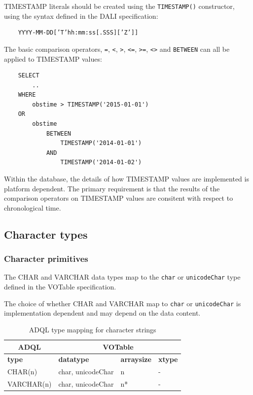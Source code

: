 \documentclass[11pt,a4paper]{ivoa}
\newcommand{\VOTspec}{VOTable specification\xspace}
\newcommand{\DALIspec}{DALI specification\xspace}
\begin{document}
TIMESTAMP literals should be created using the \verb:TIMESTAMP():
constructor, using the syntax defined in the \DALIspec:
\begin{verbatim}
    YYYY-MM-DD[’T’hh:mm:ss[.SSS][’Z’]]
\end{verbatim}

The basic comparison operators, \verb:=:, \verb:<:, \verb:>:, \verb:<=:, \verb:>=:,
\verb:<>: and \verb:BETWEEN: can all be applied to TIMESTAMP values:
\begin{verbatim}
    SELECT
        ..
    WHERE
        obstime > TIMESTAMP('2015-01-01')
    OR
        obstime
            BETWEEN
                TIMESTAMP('2014-01-01')
            AND
                TIMESTAMP('2014-01-02')
\end{verbatim}

Within the database, the details of how TIMESTAMP values are implemented
is platform dependent. The primary requirement is that the results of the
comparison operators on TIMESTAMP values are consitent with respect to
chronological time.

\subsection{Character types}
\label{sec:types.character}

\subsubsection{Character primitives}
\label{sec:types.character.primitive}

The CHAR and VARCHAR data types map to the \verb:char: or
\verb:unicodeChar: type defined in the \VOTspec.

The choice of whether CHAR and VARCHAR map to \verb:char: or
\verb:unicodeChar: is implementation dependent and may depend
on the data content.

\begin{table}[thm]\footnotesize
    \begin{tabular}
        {|p{}|p{}|p{}|p{}|}
        \hline

        \hline
        \multicolumn{1}{|c|}{\textbf{ADQL}} &
        \multicolumn{3}{|c|}{\textbf{VOTable}}
        \tabularnewline
        
        \hline
        \textbf{type} &
        \textbf{datatype} &
        \textbf{arraysize} &
        \textbf{xtype}
        \tabularnewline

        \hline
        CHAR(n) &
        char, unicodeChar &
        n &
        -
        \tabularnewline

        \hline
        VARCHAR(n) &
        char, unicodeChar &
        n* &
        -
        \tabularnewline

        \hline
    \end{tabular}
    \caption{ADQL type mapping for character strings}
    \label{table:types.character.primitive}
\end{table}
\end{document}

